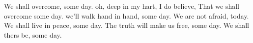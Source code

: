 \beginverse
We shall overcome,  some day.
oh, deep in my hart, I do believe,
That we shall overcome some day.
\endverse
\beginverse
we'll walk hand in hand,  some day.
\endverse
\beginverse
We are not afraid,  today.
\endverse
\beginverse
We shall live in peace,  some day.
\endverse
\beginverse
The truth will make us free, some day.
\endverse
\beginverse
We shall thers be,  some day.
\endverse
\endsong